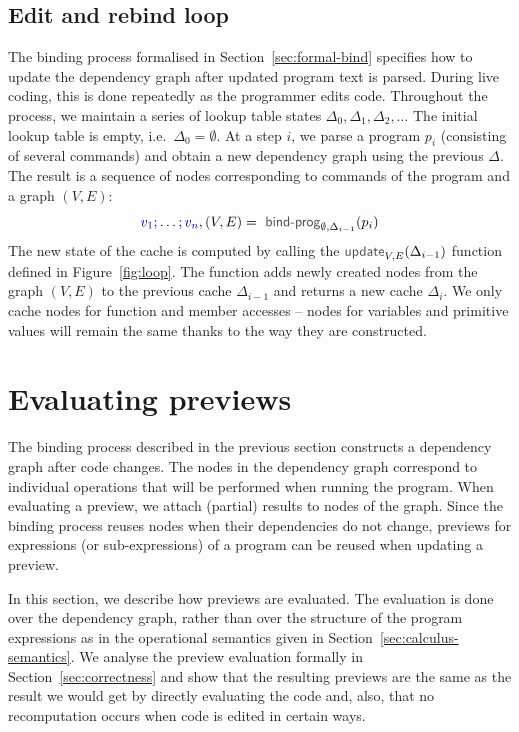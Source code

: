 \documentclass[acmsmall,anonymous,fleqn]{acmart}\settopmatter{printfolios=false,printccs=false,printacmref=false}
\theoremstyle{plain}
\theoremstyle{definition}
\newcommand{\ident}[1]{\textnormal{\textcolor{idclr}{\sffamily #1}}}
\newcommand{\bndclr}[1]{\textcolor{kvdclr}{#1}}
\begin{document}
\subsection{Edit and rebind loop}

The binding process formalised in Section~\ref{sec:formal-bind} specifies how to update the
dependency graph after updated program text is parsed. During live coding, this is done
repeatedly as the programmer edits code. Throughout the process, we maintain a series of
lookup table states $\Delta_0, \Delta_1, \Delta_2, \ldots$ The initial lookup table is
empty, i.e.~$\Delta_0 = \emptyset$. At a step $i$, we parse a program $p_i$ (consisting of
several commands) and obtain a new dependency graph using the previous $\Delta$. The result is
a sequence of nodes corresponding to commands of the program and a graph $(V, E)$:
%
\begin{equation*}
\bndclr{v_1}; \ldots; \bndclr{v_n}, (V, E) = \ident{bind-prog}_{\emptyset, \Delta_{i-1}}(p_i)
\end{equation*}
%
The new state of the cache is computed by calling the $\ident{update}_{V, E}(\Delta_{i-1})$ function
defined in Figure~\ref{fig:loop}. The function adds newly created nodes from the graph
$(V, E)$ to the previous cache $\Delta_{i-1}$ and returns a new cache $\Delta_{i}$. We only cache
nodes for function and member accesses -- nodes for variables and primitive values will remain
the same thanks to the way they are constructed.


\section{Evaluating previews}
\label{sec:previews}

The binding process described in the previous section constructs a dependency graph after code
changes. The nodes in the dependency graph correspond to individual operations that will be performed
when running the program. When evaluating a preview, we attach (partial) results to
nodes of the graph. Since the binding process reuses nodes when their dependencies do not change,
previews for expressions (or sub-expressions) of a program can be reused when updating a preview.

In this section, we describe how previews are evaluated. The evaluation is done over the dependency
graph, rather than over the structure of the program expressions as in the operational semantics
given in Section~\ref{sec:calculus-semantics}. We analyse the preview evaluation formally in
Section~\ref{sec:correctness} and show that the resulting previews are the same as the result we
would get by directly evaluating the code and, also, that no recomputation occurs when code is
edited in certain ways.
\end{document}
